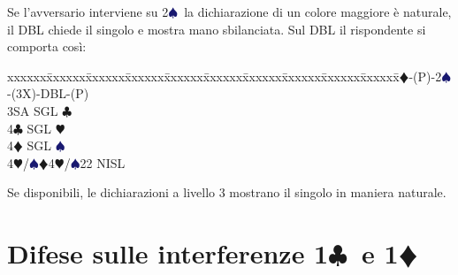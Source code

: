 \documentclass[a4paper,italian]{article}
\newcommand{\BC}{\textcolor{OliveGreen}{$\clubsuit$}}
\newcommand{\BD}{\textcolor{RedOrange}{$\vardiamondsuit$}}
\newcommand{\BH}{\textcolor{Red2}{$\varheartsuit${}}}
\newcommand{\BS}{\textcolor{MidnightBlue}{$\spadesuit${}}}
\newcommand{\pdfc}{\texorpdfstring{\BC{}}{C}}
\newcommand{\pdfd}{\texorpdfstring{\BD{}}{D}}
\newenvironment{bidtable}
{\begin{tabbing}

    xxxxxx\=xxxxxx\=xxxxxx\=xxxxxx\=xxxxxx\=xxxxxx\=xxxxxx\=xxxxxx\=xxxxxx\=xxxxxx\=\kill}
{\end{tabbing} }%
\newenvironment{attenzione}[1]
{\begin{tcolorbox}[colframe=red!80!white,title=#1]}
    {
\end{tcolorbox} }%
\begin{document}
\begin{attenzione}{Interferenze}
    Se l'avversario interviene su 2\BS\ la dichiarazione di un colore maggiore è naturale, il DBL chiede il singolo e mostra mano sbilanciata. Sul DBL il rispondente si comporta così:
    \bigbreak
    \begin{bidtable}
        1\BD-(P)-2\BS-(3X)-DBL-(P)\+\\
        3SA \> SGL \BC \\
        4\BC \> SGL \BH \\
        4\BD \> SGL \BS \\
        4\BH/\BS {}\BD 4\BH /\BS 22 NISL\-
    \end{bidtable}
    \bigbreak
    Se disponibili, le dichiarazioni a livello 3 mostrano il singolo in maniera naturale.
\end{attenzione}

\newpage

\section{Difese sulle interferenze 1\pdfc\ e 1\pdfd}
\end{document}
